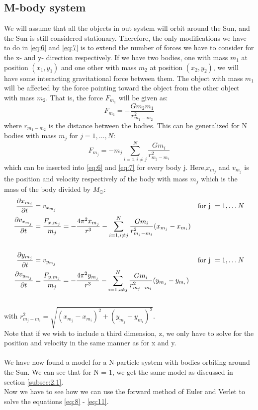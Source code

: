 \documentclass[12pt]{article}
\newcommand{\Ms}{M_\odot}
\begin{document}
	 \subsection{M-body system} \label{sec:mbody}
	 We will assume that all the objects in out system will orbit around the Sun, and the Sun is still considered stationary.
	 Therefore, the only modifications we have to do in \ref{eq:6} and \ref{eq:7} is to extend the number of forces we have to consider for the x- and y- direction respectively. If we have two bodies, one with mass $m_1$ at position $(x_1,y_1)$ and one other with mass $m_2$ at position $(x_2,y_2)$, we will have some interacting gravitational force between them. The object with mass $m_1$ will be affected by the force pointing toward the object from the other object with mass $m_2$. That is, the force $F_{m_1}$ will be given as:
	 \begin{equation*}
	 	F_{m_1} = - \dfrac{G m_2 m_1}{r_{m_1-m_2}^2}
	 \end{equation*}
	 where $r_{m_1-m_2}$ is the distance between the bodies. This can be generalized for N bodies with mass $m_j$ for $j = 1, \dots, N$:
	 \begin{equation*}
	 	F_{m_j} = -m_j\sum_{i = 1, i \not = j}^{N} \dfrac{G m_i}{r_{m_j-m_i}^2}
	 \end{equation*} which can be inserted into \ref{eq:6} and \ref{eq:7} for every body j. Here,$x_{m_j}$ and $v_{m_j}$ is the position and velocity respectively of the body with mass $m_j$ which is the mass of the body divided by $\Ms$: 
	 \begin{align} 
	 	\dfrac{\partial x_{m_j}}{\partial t} &= v_{x_{m_j}} \label{eq:8}\quad\quad\quad &\text{for j }&= 1,\dots N\\ 
	 	\dfrac{\partial v_{x_{m_j}}}{\partial t} &= \dfrac{F_{x,m_{j}}}{m_{j}} = 
	 	- \dfrac{4\pi^2 x_{m_j}}{r^3} - \sum_{i = 1, i \not = j}^{N} \dfrac{G m_i}{r_{m_j-m_i}^2}(x_{m_j}-x_{m_i}) \label{eq:9}\\
	 	\hfill \nonumber\\
	 	\dfrac{\partial y_{m_j}}{\partial t} &= v_{y_{m_j}} \label{eq:10}\quad\quad\qquad &\text{for j }&= 1,\dots N\\ 
	 	\dfrac{\partial v_{y_{m_j}}}{\partial t} &=\dfrac{F_{y,m_{j}}}{m_{j}} =	- \dfrac{4\pi^2 y_{m_j}}{r^3} - \sum_{i = 1, i \not = j}^{N} \dfrac{G m_i}{r_{m_j-m_i}^2}(y_{m_j}-y_{m_i}) \label{eq:11}
	 \end{align}\\
	 with $r_{m_j-m_i}^2=\sqrt{(x_{m_j}-x_{m_i})^2 + (y_{m_j}-y_{m_i})^2 }$.\\
	 Note that if we wish to include a third dimension, z, we only have to solve for the position and velocity in the same manner as for x and y. \\ \\We have now found a model for a N-particle system with bodies orbiting around the Sun. We can see that for N = 1, we get the same model as discussed in section \ref{subsec:2.1}. \\ Now we have to see how we can use the forward method of Euler and Verlet to solve the equations \ref{eq:8} - \ref{eq:11}.
\end{document}
